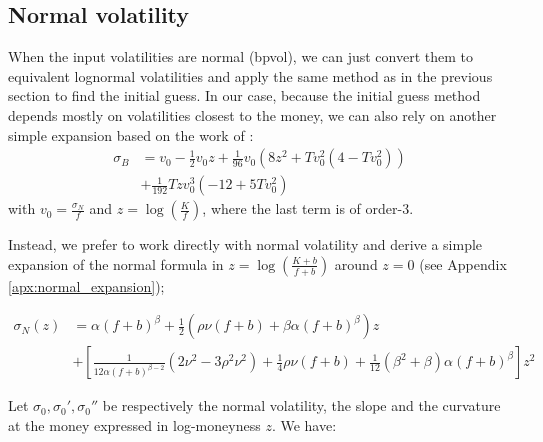 \documentclass[]{rAMF2e}
\begin{document}
\subsection{Normal volatility}
When the input volatilities are normal (bpvol), we can just convert them to equivalent lognormal volatilities and apply the same method as in the previous section to find the initial guess. In our case, because the initial guess method depends mostly on volatilities closest to the money, we can also rely on another simple expansion based on the work of \citep{lorig2014implied}:
\begin{align}
\sigma_B &= v_0 - \frac{1}{2}v_0 z + \frac{1}{96}v_0(8z^2+T v_0^2 (4-T v_0^2)) \nonumber \\
         &+ \frac{1}{192}T z v_0^3 (-12+5T v_0^2)
\end{align}
with $v_0 = \frac{\sigma_N}{f}$ and $z=\log(\frac{K}{f})$, where the last term is of order-3.

Instead, we prefer to work directly with normal volatility and derive a simple expansion of the normal formula in $z=\log\left(\frac{K+b}{f+b}\right)$ around $z=0$ (see Appendix \ref{apx:normal_expansion});

\begin{align}
\sigma_N(z) &= \alpha (f+b)^\beta + \frac{1}{2}\left(\rho \nu (f+b)+\beta \alpha (f+b)^\beta \right)z\nonumber\\
&+ \left[\frac{1}{12\alpha (f+b)^{\beta-2}}(2\nu^2-3\rho^2 \nu^2)+\frac{1}{4} \rho \nu (f+b)+\frac{1}{12}(\beta^2+\beta)\alpha (f+b)^\beta \right]z^2
\end{align}

Let $\sigma_0, \sigma_0', \sigma_0''$ be respectively the normal volatility, the slope and the curvature at the money expressed in log-moneyness $z$. We have:
\end{document}
